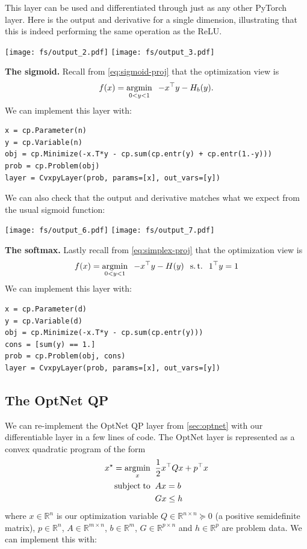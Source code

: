 This layer can be used and differentiated through
just as any other PyTorch layer.
Here is the output and derivative for a single
dimension, illustrating that this is indeed performing
the same operation as the ReLU.

\texttt{[image: fs/output\_2.pdf]}
\texttt{[image: fs/output\_3.pdf]}

\newpage
\textbf{The sigmoid.}
Recall from \cref{eq:sigmoid-proj} that the optimization view is
\begin{equation*}
f(x) = \operatorname*{argmin}_{0<y<1} \;\; -x^\top y -H_b(y).
\end{equation*}
We can implement this layer with:
\begin{lstlisting}
x = cp.Parameter(n)
y = cp.Variable(n)
obj = cp.Minimize(-x.T*y - cp.sum(cp.entr(y) + cp.entr(1.-y)))
prob = cp.Problem(obj)
layer = CvxpyLayer(prob, params=[x], out_vars=[y])
\end{lstlisting}
We can also check that the output and derivative matches
what we expect from the usual sigmoid function:

\texttt{[image: fs/output\_6.pdf]}
\texttt{[image: fs/output\_7.pdf]}

\textbf{The softmax.}
Lastly recall from \cref{eq:simplex-proj} that the optimization view is
\begin{equation*}
f(x) = \operatorname*{argmin}_{0<y<1} \;\; -x^\top y - H(y) \;\; \operatorname*{s.t.}\;\; 1^\top y = 1
\end{equation*}
We can implement this layer with:
\begin{lstlisting}
x = cp.Parameter(d)
y = cp.Variable(d)
obj = cp.Minimize(-x.T*y - cp.sum(cp.entr(y)))
cons = [sum(y) == 1.]
prob = cp.Problem(obj, cons)
layer = CvxpyLayer(prob, params=[x], out_vars=[y])
\end{lstlisting}

\newpage
\subsection{The OptNet QP}
We can re-implement the OptNet QP layer from \cref{sec:optnet}
with our differentiable \cvxpy{} layer in a few lines of code.
The OptNet layer is represented as a convex quadratic program
of the form
\begin{equation}
\begin{split}
x^\star = \operatorname*{argmin}_{x} \;\; & \frac{1} {2}x^\top Qx + p^\top x \\
\operatorname*{subject\;to} \;\; & Ax = b \\
& Gx \leq h \\
\end{split}
\label{eq:cvxpy-qp}
\end{equation}
where $x \in \mathbb{R}^n$ is our optimization variable
$Q \in \mathbb {R}^{n \times n} \succeq 0$
(a positive semidefinite matrix),
$p \in \mathbb {R}^n$,
$A\in \mathbb{R}^{m \times n}$,
$b \in \mathbb{R}^m$,
$G \in \mathbb{R}^ {p \times n}$ and
$h \in \mathbb{R}^{p}$ are problem data.
We can implement this with:

